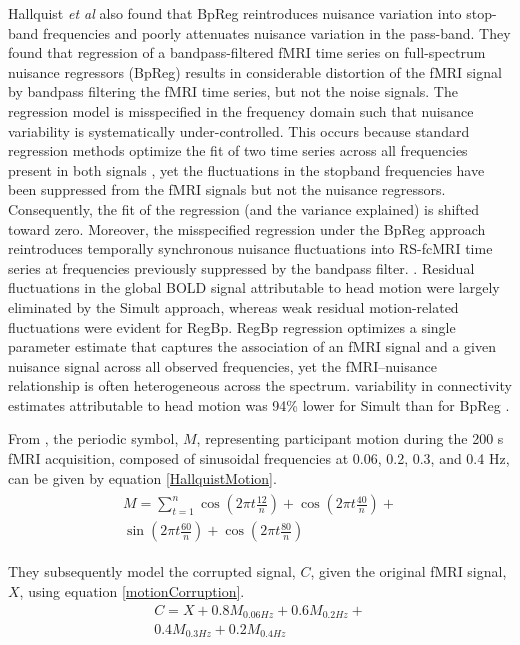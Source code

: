 \documentclass[twoside,twocolumn]{article}
\begin{document}
Hallquist {\em et al}\cite{Hallquist2013} also found that BpReg reintroduces nuisance variation into stop-band frequencies and poorly attenuates nuisance variation in the pass-band. They found that regression of a bandpass-ﬁltered fMRI time series on full-spectrum nuisance regressors (BpReg) results in considerable distortion of the fMRI signal by bandpass ﬁltering the fMRI time series, but not the noise signals.  The regression model is misspeciﬁed in the frequency domain such that nuisance variability is systematically under-controlled. This occurs because standard regression methods optimize the ﬁt of two time series across all frequencies present in both signals \cite{Engle1974}, yet the ﬂuctuations in the stopband frequencies have been suppressed from the fMRI signals but not the nuisance regressors. Consequently, the ﬁt of the regression (and the variance explained) is shifted toward zero. Moreover, the misspeciﬁed regression under the BpReg approach reintroduces temporally synchronous nuisance ﬂuctuations into RS-fcMRI time series at frequencies previously suppressed by the bandpass ﬁlter. \cite{Hallquist2013}.  Residual ﬂuctuations in the global BOLD signal attributable to head motion were largely eliminated by the Simult approach, whereas weak residual motion-related ﬂuctuations were evident for RegBp.  RegBp regression optimizes a single parameter estimate that captures the association of an fMRI signal and a given nuisance signal across all observed frequencies, yet the fMRI–nuisance relationship is often heterogeneous across the spectrum.   variability in connectivity estimates attributable to head motion was 94\% lower for Simult than for BpReg \cite{Hallquist2013}.

From \cite{Hallquist2013}, the periodic symbol, $M$, representing participant motion during the 200 s fMRI acquisition, composed of sinusoidal frequencies at 0.06, 0.2, 0.3, and 0.4 Hz, can be given by equation \ref{HallquistMotion}.
\begin{eqnarray}
	\begin{split}
	M=\sum_{t=1}^n\cos\left(2\pi t\frac{12}{n}\right)+\cos\left(2\pi t\frac{40}{n}\right)+  
	\\
	\sin\left(2\pi t\frac{60}{n}\right)+\cos\left(2\pi t\frac{80}{n}\right)
	\end{split}
\label{HallquistMotion}
\end{eqnarray}

They subsequently model the corrupted signal, $C$, given the original fMRI signal, $X$, using equation \ref{motionCorruption}.
\begin{eqnarray}
	C=X+0.8M_{0.06 Hz}+0.6M_{0.2 Hz}+
	\\ 0.4M_{0.3 Hz}+0.2M_{0.4 Hz}
\label{motionCorruption}
\end{eqnarray}
\end{document}
